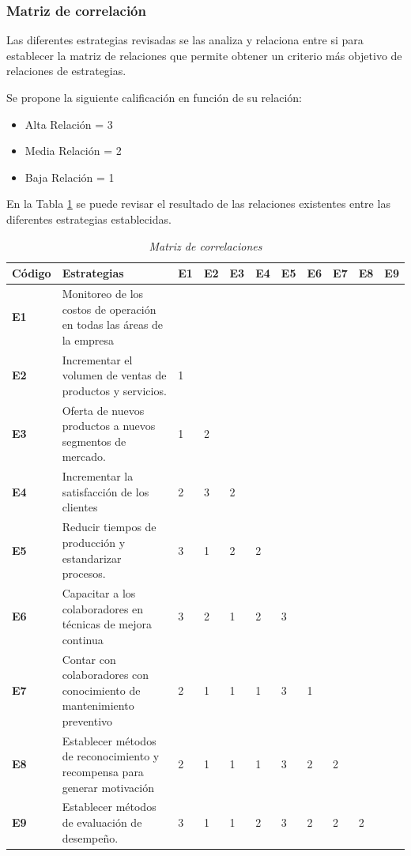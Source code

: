 \documentclass[12pt, a4paper]{article}
\begin{document}
\subsubsection{Matriz de correlación}

Las diferentes estrategias revisadas se las analiza y relaciona entre si para establecer la matriz de relaciones que permite obtener un criterio más objetivo de relaciones de estrategias.

Se propone la siguiente calificación en función de su relación: 


\begin{itemize}	
	\item Alta Relación 	= 	3
	\item Media Relación = 	2
	\item Baja Relación 	= 	1
\end{itemize}

En la Tabla \ref{tabla:2} se puede revisar el resultado de las relaciones existentes entre las diferentes estrategias establecidas.\\


\begin{table}[H]
\centering
\caption{\textit{Matriz de correlaciones}}
\label{tabla:2}
\begin{tabular}{|p{1.4cm}|p{6cm}|p{0.4cm}|p{0.4cm}|p{0.4cm}|p{0.4cm}|p{0.4cm}|p{0.4cm}|p{0.4cm}|p{0.4cm}|p{0.4cm}|}
\hline
\textbf{Código} & \textbf{Estrategias} & \textbf{E1} & \textbf{E2} & \textbf{E3} & \textbf{E4} & \textbf{E5} & \textbf{E6} & \textbf{E7} & \textbf{E8} & \textbf{E9} \\ \hline
\textbf{E1} & Monitoreo de los costos de operación en todas las áreas de la empresa &  &  &  &  &  &  &  &  &  \\ \hline
\textbf{E2} & Incrementar el volumen de ventas de productos y servicios. & 1 &  &  &  &  &  &  &  &  \\ \hline
\textbf{E3} & Oferta de nuevos productos a nuevos segmentos de mercado. & 1 & 2 &  &  &  &  &  &  &  \\ \hline
\textbf{E4} & Incrementar la satisfacción de los clientes & 2 & 3 & 2 &  &  &  &  &  &  \\ \hline
\textbf{E5} & Reducir tiempos de producción y estandarizar procesos. & 3 & 1 & 2 & 2 &  &  &  &  &  \\ \hline
\textbf{E6} & Capacitar a los colaboradores en técnicas de mejora continua & 3 & 2 & 1 & 2 & 3 &  &  &  &  \\ \hline
\textbf{E7} & Contar con colaboradores con conocimiento de mantenimiento preventivo & 2 & 1 & 1 & 1 & 3 & 1 &  &  &  \\ \hline
\textbf{E8} & Establecer métodos de reconocimiento y recompensa para generar motivación & 2 & 1 & 1 & 1 & 3 & 2 & 2 &  &  \\ \hline
\textbf{E9} & Establecer métodos de evaluación de desempeño. & 3 & 1 & 1 & 2 & 3 & 2 & 2 & 2 &  \\ \hline
\end{tabular}
\end{table}
\end{document}

